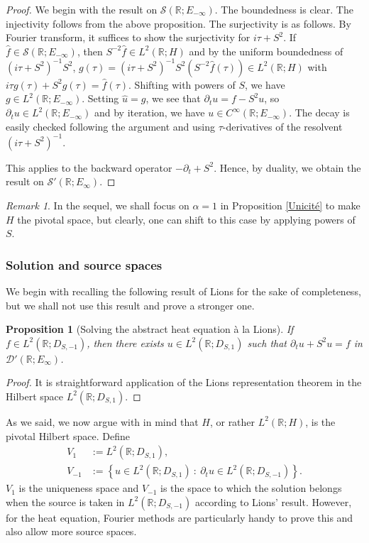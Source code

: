 \documentclass[11pt, letterpaper]{amsart}
\newtheorem{prop}[thm]{Proposition}
\theoremstyle{definition}
\theoremstyle{remark}
\newtheorem{rem}[thm]{Remark}
\numberwithin{equation}{section}
\begin{document}
\begin{proof} We begin with the result on $\mathcal{S}(\mathbb{R};E_{-\infty})$.
        The boundedness is clear. The injectivity follows from the above proposition. The surjectivity is as follows. By Fourier transform, it suffices to show the surjectivity for $i\tau+S^2$. If $\hat f\in \mathcal{S}(\mathbb{R};E_{-\infty}) $, then $S^{-2}\hat f \in L^2(\mathbb{R};H)$ and by the uniform boundedness  of $(i\tau+S^2)^{-1} S^2$,   $g(\tau)=(i\tau+S^2)^{-1} S^2 (S^{-2}\hat f(\tau)) \in L^2(\mathbb{R};H)$ with $i\tau g(\tau)+ S^2 g (\tau)= \hat f(\tau)$. Shifting with powers of $S$, we have $g\in L^2(\mathbb{R}; E_{-\infty})$. Setting $\hat u=g$, we see that $\partial_t u=f-S^2u$, so $\partial_t u\in L^2(\mathbb{R}; E_{-\infty})$ and by iteration, we have $u\in C^\infty(\mathbb{R}; E_{-\infty})$. The decay is easily checked following the argument and using $\tau$-derivatives of the resolvent $(i\tau+S^2)^{-1}$. 

        This applies to the backward operator $-\partial_t+S^2$. Hence, by duality, we obtain the result on $\mathcal{S}'(\mathbb{R};E_{\infty})$.
\end{proof}


\begin{rem}
  In  the sequel, we shall focus on $\alpha=1$ in Proposition \ref{Unicité} to make $H$ the pivotal space, but clearly, one can shift to this case by applying powers of $S$. 
\end{rem}
\subsubsection{Solution and source spaces} We begin with recalling the following  result of Lions  for the sake of completeness, but we shall not use this result and prove a stronger one.
\begin{prop}[Solving the abstract heat equation à la Lions]\label{lem: Lions}
    If $f\in L^2(\mathbb{R}; D_{S,-1})$, then there exists $u\in  L^2(\mathbb{R}; D_{S,1})$ such that $\partial_t u + S^2 u =f$ in $\mathcal{D}'(\mathbb{R};E_\infty)$.
\end{prop}
\begin{proof}
    It is straightforward application of the Lions representation theorem \cite[Théorème 1.1]{lions2013equations} in the Hilbert space $L^2(\mathbb{R}; D_{S,1})$. 
\end{proof}

As we said, we now argue with in mind that $H$, or rather $L^2(\mathbb{R}; H)$,  is the pivotal Hilbert space. Define 
\begin{align*}
    V_1&:= L^2(\mathbb{R};D_{S,1}),\\
    V_{-1}&:=\left\{ u \in L^2(\mathbb{R};D_{S,1}) \ : \ \partial_t u \in L^2(\mathbb{R};D_{S,-1}) \right\}.
\end{align*}
$V_{1}$ is the uniqueness space and $V_{-1}$ is the space to which the solution belongs when the source is taken in $L^2(\mathbb{R}; D_{S,-1})$ according to Lions' result.
However, for the  heat equation, Fourier methods are particularly handy to prove this  and also allow more source spaces.  
\end{document}

